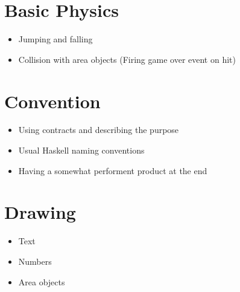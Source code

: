 \documentclass[a4paper, 10pt]{article}
\begin{document}
\section{Basic Physics}
\begin{itemize}
\item Jumping and falling
\item Collision with area objects (Firing game over event on hit)
\end{itemize}

\section{Convention}
\begin{itemize}
\item Using contracts and describing the purpose
\item Usual Haskell naming conventions
\item Having a somewhat performent product at the end
\end{itemize}

\section{Drawing}
\begin{itemize}
\item Text
\item Numbers
\item Area objects
\end{itemize}
\bigskip
\end{document}
